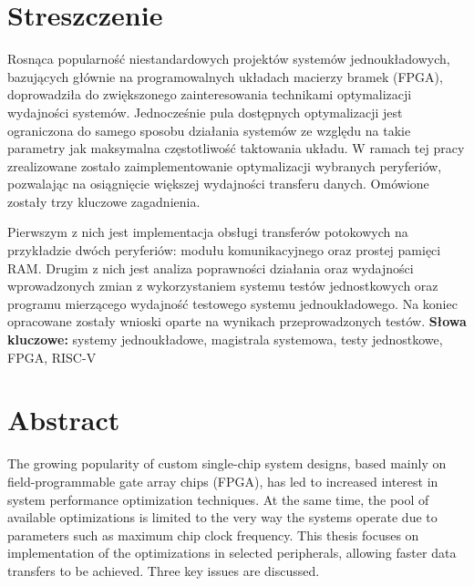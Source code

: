 \documentclass[a4paper,12pt,twoside,titlepage]{article}
\author{Kołucki Rafał}
\date{18 września 2022 r.}
\newcommand\myemptypage{
    \null
    \thispagestyle{empty}
    \addtocounter{page}{-1}
    \newpage
    }
\begin{document}
\pagestyle{fancy}
\fancyhead{} %
\fancyfoot{} %

\maketitle

\myemptypage

\section*{Streszczenie}
Rosnąca popularność niestandardowych projektów systemów jednoukładowych, bazujących głównie na programowalnych układach macierzy bramek (FPGA), doprowadziła do zwiększonego zainteresowania technikami optymalizacji wydajności systemów. Jednocześnie pula dostępnych optymalizacji jest ograniczona do samego sposobu działania systemów ze względu na takie parametry jak maksymalna częstotliwość taktowania układu. W ramach tej pracy zrealizowane zostało zaimplementowanie optymalizacji wybranych peryferiów, pozwalając na osiągnięcie większej wydajności transferu danych. Omówione zostały trzy kluczowe zagadnienia.

Pierwszym z nich jest implementacja obsługi transferów potokowych na przykładzie dwóch peryferiów: modułu komunikacyjnego oraz prostej pamięci RAM. Drugim z nich jest analiza poprawności działania oraz wydajności wprowadzonych zmian z wykorzystaniem systemu testów jednostkowych oraz programu mierzącego wydajność testowego systemu jednoukładowego. Na koniec opracowane zostały wnioski oparte na wynikach przeprowadzonych testów.
\newline\newline\newline
\textbf{Słowa kluczowe:} systemy jednoukładowe, magistrala systemowa, testy jednostkowe, FPGA, RISC-V
\newpage

\section*{Abstract}
The growing popularity of custom single-chip system designs, based mainly on field-programmable gate array chips (FPGA), has led to increased interest in system performance optimization techniques. At the same time, the pool of available optimizations is limited to the very way the systems operate due to parameters such as maximum chip clock frequency. This thesis focuses on implementation of the optimizations in selected peripherals, allowing faster data transfers to be achieved. Three key issues are discussed.
\end{document}
